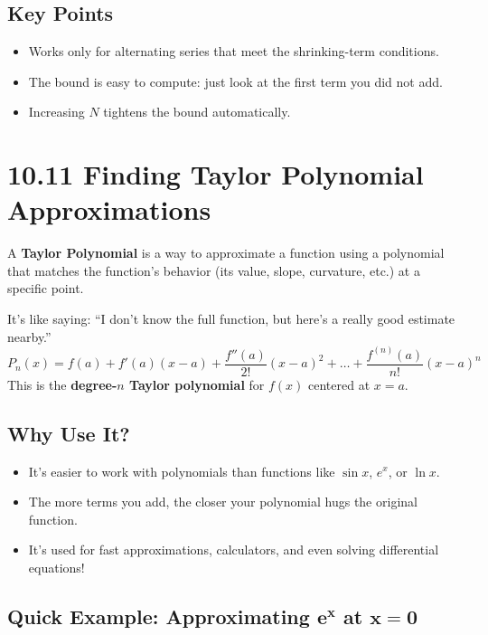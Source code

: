 \documentclass{article}
\begin{document}
\subsection*{Key Points}
\begin{itemize}[itemsep=4pt]
  \item Works only for alternating series that meet the shrinking-term conditions.
  \item The bound is easy to compute: just look at the first term you did not add.
  \item Increasing \(N\) tightens the bound automatically.
\end{itemize}

\newpage
\section{10.11 Finding Taylor Polynomial Approximations}

\begin{tcolorbox}[colback=gray!8,colframe=black,title=Big-Idea: Polynomial Stand-Ins!]
A \textbf{Taylor Polynomial} is a way to approximate a function using a polynomial that matches the function's behavior (its value, slope, curvature, etc.) at a specific point.

It’s like saying: “I don’t know the full function, but here’s a really good estimate nearby.”
\[
P_n(x) = f(a) + f'(a)(x-a) + \frac{f''(a)}{2!}(x-a)^2 + \dots + \frac{f^{(n)}(a)}{n!}(x-a)^n
\]
This is the \textbf{degree-$n$ Taylor polynomial} for \(f(x)\) centered at \(x = a\).
\end{tcolorbox}

\subsection*{Why Use It?}
\begin{itemize}
  \item It’s easier to work with polynomials than functions like \(\sin x\), \(e^x\), or \(\ln x\).
  \item The more terms you add, the closer your polynomial hugs the original function.
  \item It’s used for fast approximations, calculators, and even solving differential equations!
\end{itemize}

\subsection*{Quick Example: Approximating \(\boldsymbol{e^x}\) at \(\boldsymbol{x = 0}\)}
\end{document}
